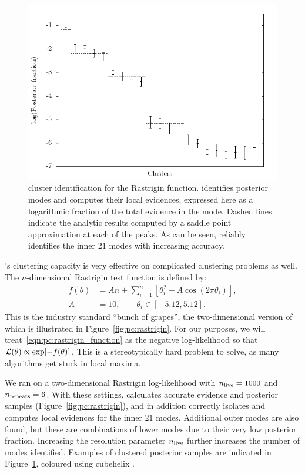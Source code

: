 \begin{figure}[tp]
  \centering
  \includegraphics[width=\columnwidth]{chapters/polychord/figures/rastrigin_data}
  \caption{\PolyChord{} cluster identification for the Rastrigin function. \PolyChord{} identifies posterior modes and computes their local evidences, expressed here as a logarithmic fraction of  the total evidence in the mode. Dashed lines indicate the analytic results computed by a saddle point approximation at each of the peaks. As can be seen, \PolyChord{} reliably identifies the inner \(21\) modes with increasing accuracy.}\label{fig:pc:rastrigin_data}
\end{figure}

\PolyChord{}'s clustering capacity is very effective on complicated clustering problems as well. The \(n\)-dimensional Rastrigin test function is defined by:
\begin{align}
  f(\theta) &= A n + \sum\limits_{i=1}^n \left[\theta_i^2 - A\cos(2 \pi \theta_i) \right],
  \label{eqn:pc:rastrigin_function}
  \\
  A&=10, \qquad \theta_i \in [-5.12,5.12]. \nonumber
\end{align}
This is the industry standard ``bunch of grapes'', the two-dimensional version of which is illustrated in Figure~\ref{fig:pc:rastrigin}.
For our purposes, we will treat~\eqref{eqn:pc:rastrigin_function} as the negative log-likelihood so that \(\mathcal{L}(\theta) \propto \exp[-f(\theta)]\).
This is a stereotypically hard problem to solve, as many algorithms get stuck in local maxima.



We ran \PolyChord{} on a two-dimensional Rastrigin log-likelihood  with \(n_{\mathrm{live}}=1000\) and \(n_{\mathrm{repeats}}=6\). With these settings, \PolyChord{} calculates accurate evidence and posterior samples (Figure~\ref{fig:pc:rastrigin}), and in addition correctly isolates and computes local evidences for the inner \(21\) modes. Additional outer modes are also found, but these are combinations of lower modes due to their very low posterior fraction. Increasing the resolution parameter \(n_{\mathrm{live}}\) further increases the number of modes identified.  Examples of clustered posterior samples are indicated in Figure~\ref{fig:pc:rastrigin_data}, coloured using cubehelix \citep{cubehelix}.


